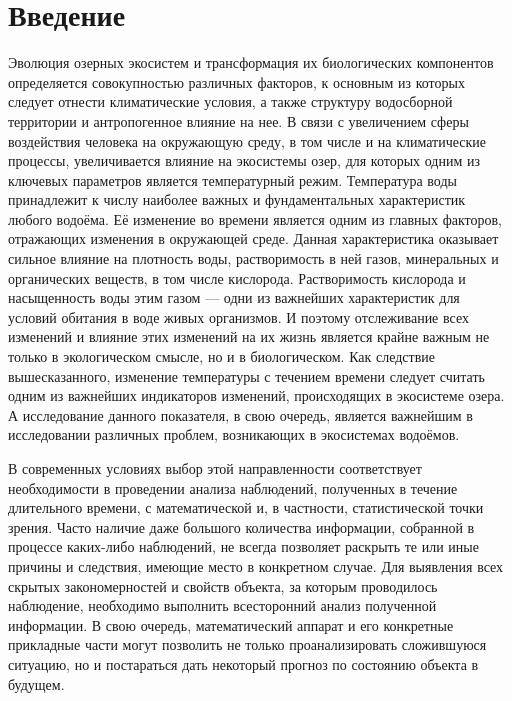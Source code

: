 
\newpage

\chapter*{Введение}

Эволюция озерных экосистем и трансформация их биологических компонентов определяется совокупностью различных факторов, к основным из которых следует отнести климатические условия, а также структуру водосборной территории и антропогенное влияние на нее. В связи с увеличением сферы воздействия человека на окружающую среду, в том числе и на климатические процессы, увеличивается влияние на экосистемы озер, для которых одним из ключевых параметров является температурный режим. Температура воды принадлежит к числу наиболее важных и фундаментальных характеристик любого водоёма. Её изменение во времени является одним из главных факторов, отражающих изменения в окружающей среде. Данная характеристика оказывает сильное влияние на плотность воды, растворимость в ней газов, минеральных и органических веществ, в том числе кислорода. Растворимость кислорода и насыщенность воды этим газом --- одни из важнейших характеристик для условий обитания в воде живых организмов. И поэтому отслеживание всех изменений и влияние этих изменений на их жизнь является крайне важным не только в экологическом смысле, но и в биологическом. Как следствие вышесказанного, изменение температуры с течением времени следует считать одним из важнейших индикаторов изменений, происходящих в экосистеме озера. А исследование данного показателя, в свою очередь, является важнейшим в исследовании различных проблем, возникающих в экосистемах водоёмов.

В современных условиях выбор этой направленности соответствует необходимости в проведении анализа наблюдений, полученных в течение длительного времени, с математической и, в частности, статистической точки зрения. Часто наличие даже большого количества информации, собранной в процессе каких-либо наблюдений, не всегда позволяет раскрыть те или иные причины и следствия, имеющие место в конкретном случае. Для выявления всех скрытых закономерностей и свойств объекта, за которым проводилось наблюдение, необходимо выполнить всесторонний анализ полученной информации. В свою очередь, математический аппарат и его конкретные прикладные части могут позволить не только проанализировать сложившуюся ситуацию, но и постараться дать некоторый прогноз по состоянию объекта в будущем.

